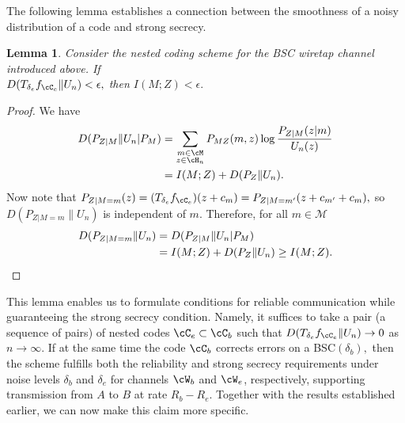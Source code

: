 \documentclass{amsart}
\newtheorem{lemma}[theorem]{Lemma}
\theoremstyle{remark}
\begin{document}
The following lemma establishes a connection between the smoothness of a noisy distribution of a code and strong secrecy.
\begin{lemma}\label{lemma: secrecy and smoothing}
    Consider the nested coding scheme for the BSC wiretap channel introduced above. If \\
    $D(T_{\delta_e}f_{\cC_e}\|U_n) < \epsilon,$ then $I(M;Z) < \epsilon.$
\end{lemma}
\begin{proof}  
 We have    
 \begin{align*}
        D(P_{Z|M}\|U_n|P_M) &= \sum_{\substack{m\in \cM \\z\in \cH_n  }}
        P_{MZ}(m,z)\log\frac{P_{Z|M}(z|m)}{U_n(z)}        
        \\
        &=I(M;Z) + D(P_{Z}\|U_n).
    \end{align*}
 Now note that $P_{Z|M=m}(z) = (T_{\delta_e}f_{\cC_e})(z+c_m) = P_{Z|M=m'}(z+c_{m'}+c_m),$ so $D(P_{Z|M=m}\|U_n) $ is independent of $m$. Therefore, for all  $m \in \mathcal{M}$
    \begin{align*}
        D(P_{Z|M=m}\|U_n) &= D(P_{Z|M}\|U_n|P_M)\\
        &=
        I(M;Z) + D(P_{Z}\|U_n) \geq I(M;Z). \qedhere
    \end{align*}
 \end{proof}
%
This lemma enables us to formulate conditions for reliable communication while guaranteeing the strong secrecy condition. 
Namely, it suffices to take a pair (a sequence of pairs) of nested codes $\cC_e\subset \cC_b$ such that $D(T_{\delta_e}f_{\cC_e}\|U_n)  \rightarrow 0$ as $n\to\infty.$ If at the same time the code $\cC_b$ corrects errors on a BSC$(\delta_b),$ then the scheme fulfills both the reliability and strong secrecy requirements under noise levels $\delta_b$ and $\delta_e$ for channels $\cW_b$ and $\cW_e$, respectively, supporting transmission from $A$ to $B$ at rate $R_b-R_e$. Together with the 
results established earlier, we can now make this claim more specific. 
\end{document}
